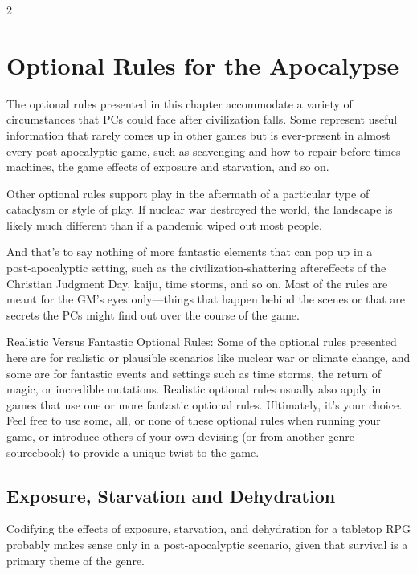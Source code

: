 \begin{multicols}{2}

\chapter{Optional Rules for the Apocalypse}
 
The optional rules presented in this chapter accommodate a variety of circumstances that PCs could face after civilization falls. Some represent useful information that rarely comes up in other games but is ever‑present in almost every post‑apocalyptic game, such as scavenging and how to repair before‑times machines, the game effects of exposure and starvation, and so on. 

Other optional rules support play in the aftermath of a particular type of cataclysm or style of play. If nuclear war destroyed the world, the landscape is likely much different than if a pandemic wiped out most people. 

And that’s to say nothing of more fantastic elements that can pop up in a post‑apocalyptic setting, such as the civilization‑shattering aftereffects of the Christian Judgment Day, kaiju, time storms, and so on. 
Most of the rules are meant for the GM’s eyes only—things that happen behind the scenes or that are secrets the PCs might find out over the course of the game.

Realistic Versus Fantastic Optional Rules: Some of the optional rules presented here are for realistic or plausible scenarios like nuclear war or climate change, and some are for fantastic events and settings such as time storms, the return of magic, or incredible mutations. Realistic optional rules usually also apply in games that use one or more fantastic optional rules. Ultimately, it’s your choice. Feel free to use some, all, or none of these optional rules when running your game, or introduce others of your own devising (or from another genre sourcebook) to provide a unique twist to the game.

\section{Exposure, Starvation and Dehydration}

Codifying the effects of exposure, starvation, and dehydration for a tabletop RPG probably makes sense only in a post‑apocalyptic scenario, given that survival is a primary theme of the genre.


\end{multicols}
